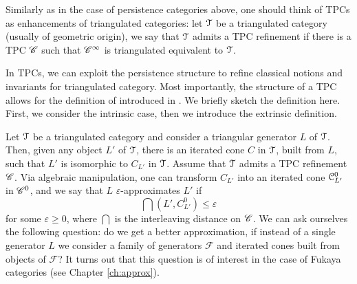 Similarly as in the case of persistence categories above, one should think of TPCs as enhancements of triangulated categories: let $\mathcal{T}$ be a triangulated category (usually of geometric origin), we say that $\mathcal{T}$ admits a TPC refinement if there is a TPC ${\mathscr{C}}$ such that ${\mathscr{C}}^\infty$ is triangulated equivalent to $\mathcal{T}$.


In TPCs, we can exploit the persistence structure to refine classical notions and invariants for triangulated category. Most importantly, the structure of a TPC allows for the definition of  introduced in \cite{ABC26}. We briefly sketch the definition here. First, we consider the intrinsic case, then we introduce the extrinsic definition.

Let $\mathcal{T}$ be a triangulated category and consider a triangular generator $L$ of $\mathcal{T}$. Then, given any object $L'$ of $\mathcal{T}$, there is an iterated cone $C$ in $\mathcal{T}$, built from $L$, such that $L'$ is isomorphic to $C_{L'}$ in $\mathcal{T}$. Assume that $\mathcal{T}$ admits a TPC refinement ${\mathscr{C}}$. Via algebraic manipulation, one can transform $C_{L'}$ into an iterated cone $\mathcal{C}_{L'}^0$ in ${\mathscr{C}}^0$, and we say that $L$ $\varepsilon$-approximates $L'$ if $$\dint(L',C_{L'}^0)\leq \varepsilon$$ for some $\varepsilon\geq0$, where $\dint$ is the interleaving distance on ${\mathscr{C}}$. We can ask ourselves the following question: do we get a better approximation, if instead of a single generator $L$ we consider a family of generators $\mathcal{F}$ and iterated cones built from objects of $\mathcal{F}$? It turns out that this question is of interest in the case of Fukaya categories (see Chapter \ref{ch:approx}). 


